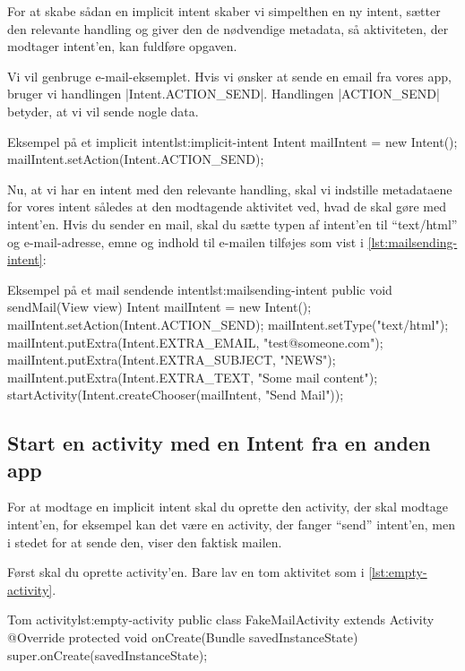 For at skabe sådan en implicit intent skaber vi simpelthen en ny intent, sætter den relevante handling og giver den de nødvendige metadata, så aktiviteten, der modtager intent'en, kan fuldføre opgaven.

Vi vil genbruge e-mail-eksemplet. Hvis vi ønsker at sende en email fra vores app, bruger vi handlingen \JavaInline|Intent.ACTION_SEND|. Handlingen \JavaInline|ACTION_SEND| betyder, at vi vil sende nogle data.

\begin{JavaCode}{Eksempel på et implicit intent}{lst:implicit-intent}
	Intent mailIntent = new Intent();
	mailIntent.setAction(Intent.ACTION_SEND);
\end{JavaCode}

Nu, at vi har en intent med den relevante handling, skal vi indstille metadataene for vores intent således at den modtagende aktivitet ved, hvad de skal gøre med intent'en. Hvis du sender en mail, skal du sætte typen af intent'en til ``text/html'' og e-mail-adresse, emne og indhold til e-mailen tilføjes som vist i \autoref{lst:mailsending-intent}:

\begin{JavaCode}{Eksempel på et mail sendende intent}{lst:mailsending-intent}
	public void sendMail(View view) {
		Intent mailIntent = new Intent();
		mailIntent.setAction(Intent.ACTION_SEND);
		mailIntent.setType("text/html");
		mailIntent.putExtra(Intent.EXTRA_EMAIL, "test@someone.com");
		mailIntent.putExtra(Intent.EXTRA_SUBJECT, "NEWS");
		mailIntent.putExtra(Intent.EXTRA_TEXT, "Some mail content");
		startActivity(Intent.createChooser(mailIntent, "Send Mail"));
	}
\end{JavaCode}

\subsection{Start en activity med en Intent fra en anden app}

For at modtage en implicit intent skal du oprette den activity, der skal modtage intent'en, for eksempel kan det være en activity, der fanger ``send'' intent'en, men i stedet for at sende den, viser den faktisk mailen.

Først skal du oprette activity'en. Bare lav en tom aktivitet som i \autoref{lst:empty-activity}.

\begin{JavaCode}{Tom activity}{lst:empty-activity}
	public class FakeMailActivity extends Activity {
		@Override
		protected void onCreate(Bundle savedInstanceState) {
			super.onCreate(savedInstanceState);
		}
	}
\end{JavaCode}

